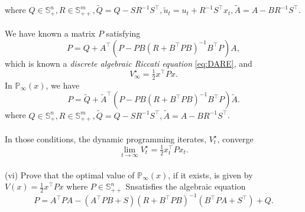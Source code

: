 \documentclass[a4paper,11pt,reqno]{amsart}
\newcommand{\tran}{\intercal}
\begin{document}
where $Q\in \mathbb{S}^n_+, R\in \mathbb{S}^m_{++}, \tilde{Q}=Q-SR^{-1}S^{\tran}, \tilde{u}_t=u_t+R^{-1}S^{\tran}x_t, \tilde{A}=A-BR^{-1}S^{\tran}$.
\\ \\
We have known a matrix $P$ satisfying
\begin{equation}
    P=Q+A^{\tran}(P-PB(R+B^{\tran}PB)^{-1}B^{\tran}P)A,
    \tag{DARE}
    \label{eq:DARE}
\end{equation}
which is known a \emph{discrete algebraic Riccati equation} \eqref{eq:DARE}, and
\begin{equation}
    V^{\star}_{\infty}=\tfrac{1}{2}x^{\tran}Px.
\end{equation}
In $\mathbb{P}_{\infty}(x)$, we have
\begin{equation}
    P=\tilde{Q}+\tilde{A}^{\tran}(P-PB(R+B^{\tran}PB)^{-1}B^{\tran}P)\tilde{A}.
    \label{eq:P_N}
\end{equation}
where $Q\in \mathbb{S}^n_+, R\in \mathbb{S}^m_{++}, \tilde{Q}=Q-SR^{-1}S^{\tran}, \tilde{A}=A-BR^{-1}S^{\tran}$.
\\ \\
In those conditions, the dynamic programming iterates, $V^{\star}_t$, converge
\begin{equation}
    \lim_{t\to\infty}V^{\star}_{t}=\tfrac{1}{2}x_t^{\tran}Px_t.
\end{equation}
\
\\
(vi) Prove that the optimal value of $\mathbb{P}_{\infty}(x)$, if it exists, is given by $V(x)=\frac{1}{2}x^{\tran}Px$ where $P\in \mathbb{S}^n_{++}$ Snsatisfies the algebraic equation
\begin{equation}
    P=A^{\tran}PA-(A^{\tran}PB+S)(R+B^{\tran}PB)^{-1}(B^{\tran}PA+S^{\tran})+Q.
    \label{eq:P}
\end{equation}
\\
\end{document}
